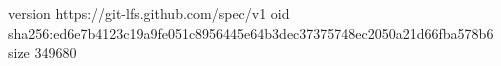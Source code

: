 version https://git-lfs.github.com/spec/v1
oid sha256:ed6e7b4123c19a9fe051c8956445e64b3dec37375748ec2050a21d66fba578b6
size 349680
